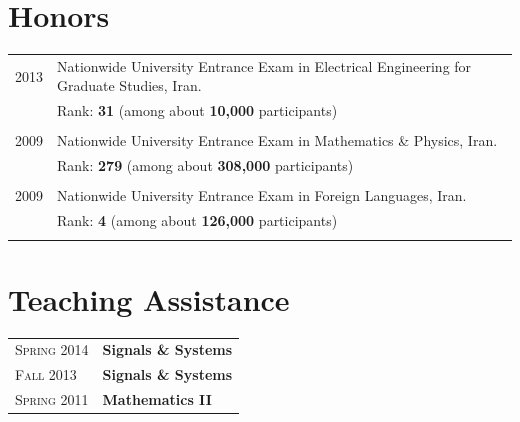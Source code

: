 \documentclass[a4paper,10pt]{article}
\begin{document}
\section{Honors}
\begin{tabular}{rl}	
 \textsc{2013}  & Nationwide University Entrance Exam in Electrical Engineering for Graduate Studies, Iran.\\
& Rank: \textbf{31} (among about \textbf{10,000} participants)\\\\

\textsc{2009}& Nationwide University Entrance Exam in Mathematics \& Physics, Iran. \\
& Rank: \textbf{279} (among about \textbf{308,000} participants)\\\\

\textsc{2009}& Nationwide University Entrance Exam in Foreign Languages, Iran.\\
& Rank: \textbf{4} (among about \textbf{126,000} participants)\\\\

\end{tabular}



\section{Teaching Assistance}
\begin{tabular}{ll}	
 \textsc{Spring 2014}  & \textbf{Signals \& Systems}\\
\textsc{Fall 2013}& \textbf{Signals \& Systems} \\
\vspace{1mm}
\textsc{Spring 2011}& \textbf{Mathematics II}\\
\end{tabular}


\newpage
\end{document}
